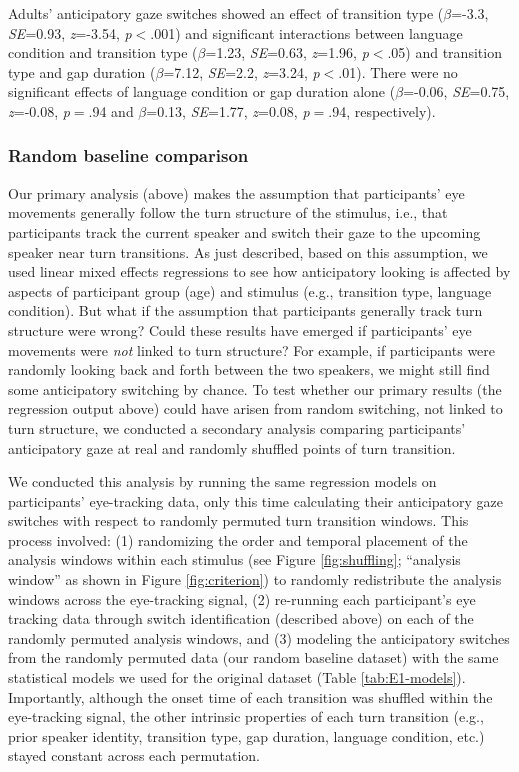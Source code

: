 \documentclass[authoryear, 12pt]{elsarticle}
\begin{document}
Adults' anticipatory gaze switches showed an effect of transition type (\textit{$\beta$}=-3.3, \textit{SE}=0.93, \textit{z}=-3.54, \textit{p}$<$.001) and significant interactions between language condition and transition type (\textit{$\beta$}=1.23, \textit{SE}=0.63, \textit{z}=1.96, \textit{p}$<$.05) and transition type and gap duration (\textit{$\beta$}=7.12, \textit{SE}=2.2, \textit{z}=3.24, \textit{p}$<$.01). There were no significant effects of language condition or gap duration alone (\textit{$\beta$}=-0.06, \textit{SE}=0.75, \textit{z}=-0.08, \textit{p}$=$.94 and \textit{$\beta$}=0.13, \textit{SE}=1.77, \textit{z}=0.08, \textit{p}$=$.94, respectively).


\subsubsection*{Random baseline comparison}
\label{sec:randbaseline1}

Our primary analysis (above) makes the assumption that participants' eye movements generally follow the turn structure of the stimulus, i.e., that participants track the current speaker and switch their gaze to the upcoming speaker near turn transitions. As just described, based on this assumption, we used linear mixed effects regressions to see how anticipatory looking is affected by aspects of participant group (age) and stimulus (e.g., transition type, language condition). But what if the assumption that participants generally track turn structure were wrong? Could these results have emerged if participants' eye movements were \textit{not} linked to turn structure? For example, if participants were randomly looking back and forth between the two speakers, we might still find some anticipatory switching by chance. To test whether our primary results (the regression output above) could have arisen from random switching, not linked to turn structure, we conducted a secondary analysis comparing participants' anticipatory gaze at real and randomly shuffled points of turn transition.

We conducted this analysis by running the same regression models on participants' eye-tracking data, only this time calculating their anticipatory gaze switches with respect to randomly permuted turn transition windows. This process involved: (1) randomizing the order and temporal placement of the analysis windows within each stimulus (see Figure \ref{fig:shuffling}; ``analysis window'' as shown in Figure \ref{fig:criterion}) to randomly redistribute the analysis windows across the eye-tracking signal, (2) re-running each participant's eye tracking data through switch identification (described above) on each of the randomly permuted analysis windows, and (3) modeling the anticipatory switches from the randomly permuted data (our random baseline dataset) with the same statistical models we used for the original dataset (Table \ref{tab:E1-models}). Importantly, although the onset time of each transition was shuffled within the eye-tracking signal, the other intrinsic properties of each turn transition (e.g., prior speaker identity, transition type, gap duration, language condition, etc.) stayed constant across each permutation.
\end{document}
